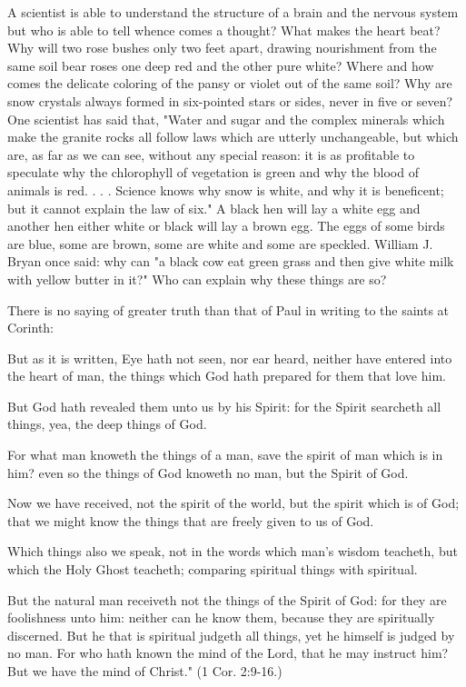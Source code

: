 A scientist is able to understand the structure of a brain and the nervous system but who is
able to tell whence comes a thought? What makes the heart beat? Why will two rose bushes
only two feet apart, drawing nourishment from the same soil bear roses one deep red and the
other pure white? Where and how comes the delicate coloring of the pansy or violet out of
the same soil? Why are snow crystals always formed in six-pointed stars or sides, never in
five or seven? One scientist has said that, "Water and sugar and the complex minerals which
make the granite rocks all follow laws which are utterly unchangeable, but which are, as far
as we can see, without any special reason: it is as profitable to speculate why the chlorophyll
of vegetation is green and why the blood of animals is red. . . . Science knows why snow is
white, and why it is beneficent; but it cannot explain the law of six." A black hen will lay a
white egg and another hen either white or black will lay a brown egg. The eggs of some birds
are blue, some are brown, some are white and some are speckled. William J. Bryan once
said: why can "a black cow eat green grass and then give white milk with yellow butter in
it?" Who can explain why these things are so?

There is no saying of greater truth than that of Paul in writing to the saints at Corinth:

But as it is written, Eye hath not seen, nor ear heard, neither have entered into the heart of
man, the things which God hath prepared for them that love him.

But God hath revealed them unto us by his Spirit: for the Spirit searcheth all things, yea, the
deep things of God.

For what man knoweth the things of a man, save the spirit of man which is in him? even so
the things of God knoweth no man, but the Spirit of God.

Now we have received, not the spirit of the world, but the spirit which is of God; that we
might know the things that are freely given to us of God.

Which things also we speak, not in the words which man's wisdom teacheth, but which the
Holy Ghost teacheth; comparing spiritual things with spiritual.

But the natural man receiveth not the things of the Spirit of God: for they are foolishness
unto him: neither can he know them, because they are spiritually discerned.
But he that is spiritual judgeth all things, yet he himself is judged by no man.
For who hath known the mind of the Lord, that he may instruct him? But we have the mind
of Christ." (1 Cor. 2:9-16.)

